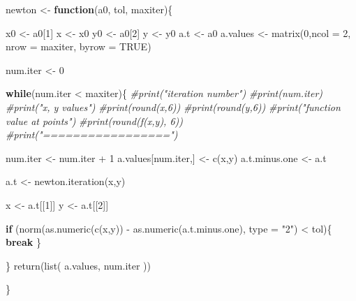 \documentclass[
]{article}
\newenvironment{Shaded}{\begin{snugshade}}{\end{snugshade}}
\newcommand{\AttributeTok}[1]{\textcolor[rgb]{0.77,0.63,0.00}{#1}}
\newcommand{\CommentTok}[1]{\textcolor[rgb]{0.56,0.35,0.01}{\textit{#1}}}
\newcommand{\ConstantTok}[1]{\textcolor[rgb]{0.00,0.00,0.00}{#1}}
\newcommand{\ControlFlowTok}[1]{\textcolor[rgb]{0.13,0.29,0.53}{\textbf{#1}}}
\newcommand{\DecValTok}[1]{\textcolor[rgb]{0.00,0.00,0.81}{#1}}
\newcommand{\FunctionTok}[1]{\textcolor[rgb]{0.00,0.00,0.00}{#1}}
\newcommand{\NormalTok}[1]{#1}
\newcommand{\OtherTok}[1]{\textcolor[rgb]{0.56,0.35,0.01}{#1}}
\newcommand{\SpecialCharTok}[1]{\textcolor[rgb]{0.00,0.00,0.00}{#1}}
\newcommand{\StringTok}[1]{\textcolor[rgb]{0.31,0.60,0.02}{#1}}
\begin{document}
\begin{Shaded}
\begin{Highlighting}[]
\NormalTok{newton }\OtherTok{\textless{}{-}} \ControlFlowTok{function}\NormalTok{(a0, tol, maxiter)\{}
  
\NormalTok{  x0 }\OtherTok{\textless{}{-}}\NormalTok{ a0[}\DecValTok{1}\NormalTok{]}
\NormalTok{  x }\OtherTok{\textless{}{-}}\NormalTok{ x0}
\NormalTok{  y0 }\OtherTok{\textless{}{-}}\NormalTok{ a0[}\DecValTok{2}\NormalTok{]}
\NormalTok{  y }\OtherTok{\textless{}{-}}\NormalTok{ y0}
\NormalTok{  a.t }\OtherTok{\textless{}{-}}\NormalTok{ a0}
\NormalTok{  a.values }\OtherTok{\textless{}{-}} \FunctionTok{matrix}\NormalTok{(}\DecValTok{0}\NormalTok{,}\AttributeTok{ncol =} \DecValTok{2}\NormalTok{, }\AttributeTok{nrow =}\NormalTok{ maxiter, }\AttributeTok{byrow =} \ConstantTok{TRUE}\NormalTok{)}
  
\NormalTok{  num.iter }\OtherTok{\textless{}{-}} \DecValTok{0}
  
  \ControlFlowTok{while}\NormalTok{(num.iter }\SpecialCharTok{\textless{}}\NormalTok{ maxiter)\{}
    \CommentTok{\#print("iteration number")}
    \CommentTok{\#print(num.iter)}
    \CommentTok{\#print("x, y values")}
    \CommentTok{\#print(round(x,6))}
    \CommentTok{\#print(round(y,6))}
    \CommentTok{\#print("function value at points")}
    \CommentTok{\#print(round(f(x,y), 6))}
    \CommentTok{\#print("=================")}
    
\NormalTok{    num.iter }\OtherTok{\textless{}{-}}\NormalTok{ num.iter }\SpecialCharTok{+} \DecValTok{1}
\NormalTok{    a.values[num.iter,] }\OtherTok{\textless{}{-}} \FunctionTok{c}\NormalTok{(x,y)}
\NormalTok{    a.t.minus.one }\OtherTok{\textless{}{-}}\NormalTok{ a.t}
    
\NormalTok{    a.t }\OtherTok{\textless{}{-}} \FunctionTok{newton.iteration}\NormalTok{(x,y)}
    
\NormalTok{    x }\OtherTok{\textless{}{-}}\NormalTok{ a.t[[}\DecValTok{1}\NormalTok{]]}
\NormalTok{    y }\OtherTok{\textless{}{-}}\NormalTok{ a.t[[}\DecValTok{2}\NormalTok{]]}
    
    
    \ControlFlowTok{if}\NormalTok{ (}\FunctionTok{norm}\NormalTok{(}\FunctionTok{as.numeric}\NormalTok{(}\FunctionTok{c}\NormalTok{(x,y)) }\SpecialCharTok{{-}} \FunctionTok{as.numeric}\NormalTok{(a.t.minus.one), }\AttributeTok{type =} \StringTok{"2"}\NormalTok{) }\SpecialCharTok{\textless{}}\NormalTok{ tol)\{}
      \ControlFlowTok{break}
\NormalTok{    \}}
    
\NormalTok{  \}}
  \FunctionTok{return}\NormalTok{(}\FunctionTok{list}\NormalTok{(}
\NormalTok{    a.values,}
\NormalTok{    num.iter}
\NormalTok{  ))}
  
\NormalTok{\}}
\end{Highlighting}
\end{Shaded}
\end{document}
